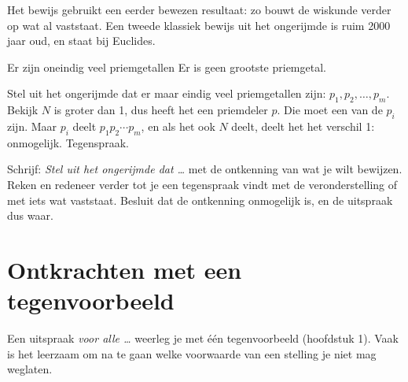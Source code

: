 Het bewijs gebruikt een eerder bewezen resultaat: zo bouwt de wiskunde verder op wat al vaststaat. Een tweede klassiek bewijs uit het ongerijmde is ruim 2000 jaar oud, en staat bij Euclides.

\begin{theorie}
\begin{stelling}{Er zijn oneindig veel priemgetallen}
Er is geen grootste priemgetal.
\end{stelling}

\begin{bewijs}
Stel uit het ongerijmde dat er maar eindig veel priemgetallen zijn: $p_1, p_2, \ldots, p_m$. Bekijk
$N$ is groter dan 1, dus heeft het een priemdeler $p$. Die moet een van de $p_i$ zijn. Maar $p_i$ deelt $p_1 p_2 \cdots p_m$, en als het ook $N$ deelt, deelt het het verschil 1: onmogelijk. Tegenspraak.
\end{bewijs}
\end{theorie}

\begin{werkwijze}
Schrijf: \textit{Stel uit het ongerijmde dat \ldots} met de ontkenning van wat je wilt bewijzen. Reken en redeneer verder tot je een tegenspraak vindt met de veronderstelling of met iets wat vaststaat. Besluit dat de ontkenning onmogelijk is, en de uitspraak dus waar.
\end{werkwijze}

\begin{oefeningen}


\end{oefeningen}

\section{Ontkrachten met een tegenvoorbeeld}

Een uitspraak \textit{voor alle \ldots} weerleg je met één tegenvoorbeeld (hoofdstuk 1). Vaak is het leerzaam om na te gaan welke voorwaarde van een stelling je niet mag weglaten.


